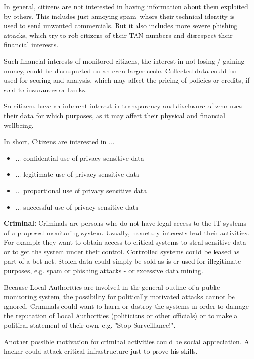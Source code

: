 In general, citizens are not interested in having information about them exploited by others. 
This includes just annoying spam, where their technical identity is used to send unwanted commercials.
But it also includes more severe phishing attacks, which try to rob citizens of their TAN numbers and disrespect their financial interests.

Such financial interests of monitored citizens, the interest in not losing / gaining money, could be disrespected on an even larger scale.
Collected data could be used for scoring and analysis, which may affect the pricing of policies or credits, if sold to insurances or banks.

So citizens have an inherent interest in transparency and disclosure of who uses their data for which purposes, as it may affect their physical and financial wellbeing.

In short, Citizens are interested in ...
\begin{itemize}
\item ... confidential use of privacy sensitive data
\item ... legitimate use of privacy sensitive data
\item ... proportional use of privacy sensitive data
\item ... successful use of privacy sensitive data
\end{itemize}

\textbf{Criminal:}
Criminals are persons who do not have legal access to the IT systems of a proposed monitoring system.
Usually, monetary interests lead their activities.
For example they want to obtain access to critical systems to steal sensitive data or to get the system under their control.
Controlled systems could be leased as part of a bot net. 
Stolen data could simply be sold as is or used for illegitimate purposes, e.g. spam or phishing attacks - or excessive data mining.  

Because Local Authorities are involved in the general outline of a public monitoring system, the possibility for politically motivated attacks cannot be ignored. 
Criminals could want to harm or destroy the systems in order to damage the reputation of Local Authorities (politicians or other officials) or to make a political statement of their own, e.g. "Stop Surveillance!".

Another possible motivation for criminal activities could be social appreciation.
A hacker could attack critical infrastructure just to prove his skills.

